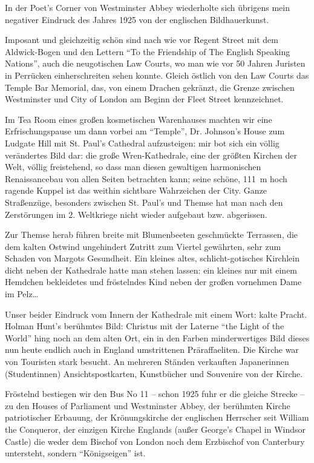 \documentclass[a5paper,pagesize,10pt,twoside=true]{scrbook}
\begin{document}
In der Poet's Corner von Westminster Abbey wiederholte sich übrigens mein negativer Eindruck des Jahres 1925 von der englischen Bildhauerkunst.

Imposant und gleichzeitig schön sind nach wie vor Regent Street mit dem Aldwick-Bogen und den Lettern \enquote{To the Friendship of The English Speaking Nations}, auch die neugotischen Law Courts, wo man wie vor 50 Jahren Juristen in Perrücken einherschreiten sehen konnte. Gleich östlich von den Law Courts das Temple Bar Memorial, das, von einem Drachen gekränzt, die Grenze zwischen Westminster und City of London am Beginn der Fleet Street kennzeichnet.

Im Tea Room eines großen kosmetischen Warenhauses machten wir eine Erfrischungspause um dann vorbei am \enquote{Temple}, Dr. Johnson's House zum Ludgate Hill mit St. Paul's Cathedral aufzusteigen: mir bot sich ein völlig verändertes Bild dar: die große Wren-Kathedrale, eine der größten Kirchen der Welt, völlig freistehend, so dass man diesen gewaltigen harmonischen Renaissancebau von allen Seiten betrachten kann; seine schöne, 111~m hoch ragende Kuppel ist das weithin sichtbare Wahrzeichen der City. Ganze Straßenzüge, besonders zwischen St. Paul's und Themse hat man nach den Zerstörungen im 2. Weltkriege nicht wieder aufgebaut bzw. abgerissen.

Zur Themse herab führen breite mit Blumenbeeten geschmückte Terrassen, die dem kalten Ostwind ungehindert Zutritt zum Viertel gewährten, sehr zum Schaden von Margots Gesundheit. Ein kleines altes, schlicht-gotisches Kirchlein dicht neben der Kathedrale hatte man stehen lassen: ein kleines nur mit einem Hemdchen bekleidetes und fröstelndes Kind neben der großen vornehmen Dame im Pelz\dots

Unser beider Eindruck vom Innern der Kathedrale mit einem Wort: kalte Pracht. Holman Hunt's berühmtes Bild: Christus mit der Laterne \enquote{the Light of the World} hing noch an dem alten Ort, ein in den Farben minderwertiges Bild dieses nun heute endlich auch in England umstrittenen Präraffaeliten. Die Kirche war von Touristen stark besucht. An mehreren Ständen verkauften Japanerinnen (Studentinnen) Ansichtspostkarten, Kunstbücher und Souvenire von der Kirche.

Fröstelnd bestiegen wir den Bus No 11 -- schon 1925 fuhr er die gleiche Strecke -- zu den Houses of Parliament und Westminster Abbey, der berühmten Kirche patriotischer Erbauung, der Krönungskirche der englischen Herrscher seit William the Conqueror, der einzigen Kirche Englands (außer George's Chapel in Windsor Castle) die weder dem Bischof von London noch dem Erzbischof von Canterbury untersteht, sondern \enquote{Königseigen} ist.
\end{document}
